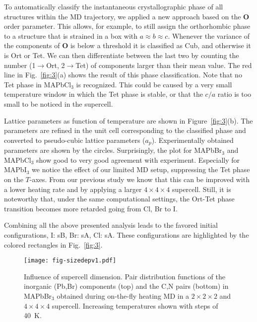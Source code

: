 \documentclass[journal=jpccck,manuscript=article,layout=twocolumn]{achemso}
\begin{document}
To automatically classify the instantaneous crystallographic phase of all structures within the MD trajectory, we applied a new approach based on the $\mathbf{O}$ order parameter. This allows, for example, to still assign the orthorhombic phase to a structure that is strained in a box with $a\approx{}b\approx{}c$. Whenever the variance of the components of $\mathbf{O}$ is below a threshold it is classified as Cub, and otherwise it is Ort or Tet. We can then differentiate between the last two by counting the number (1$\rightarrow{}$Ort, 2$\rightarrow{}$Tet) of components larger than their mean value. The red line in Fig.~\ref{fig:3}(a) shows the result of this phase classification. Note that no Tet phase in MAPbCl$_3$ is recognized. This could be caused by a very small temperature window in which the Tet phase is stable, or that the $c/a$ ratio is too small to be noticed in the supercell.

Lattice parameters as function of temperature are shown in Figure~\ref{fig:3}(b). The parameters are refined in the unit cell corresponding to the classified phase and converted to pseudo-cubic lattice parameters ($a_p$). Experimentally obtained parameters are shown by the circles. Surprisingly, the plot for MAPbBr$_3$ and MAPbCl$_3$ show good to very good agreement with experiment. Especially for MAPbI$_3$ we notice the effect of our limited MD setup, suppressing the Tet phase on the $T$-axes. From our previous study we know that this can be improved with a lower heating rate and by applying a larger $4\times4\times4$ supercell. Still, it is noteworthy that, under the same computational settings, the Ort-Tet phase transition becomes more retarded going from Cl, Br to I.

Combining all the above presented analysis leads to the favored initial configurations, I: sB, Br: sA, Cl: sA. These configurations are highlighted by the colored rectangles in Fig.~\ref{fig:3}.



\begin{figure}[!b]
    \begin{center}
    \texttt{[image: fig-sizedepv1.pdf]}
    \end{center}
   \caption{Influence of supercell dimension. Pair distribution functions of the inorganic (Pb,Br) components (top) and the C,N pairs (bottom) in MAPbBr$_3$ obtained during on-the-fly heating MD in a $2\times2\times2$ and $4\times4\times4$ supercell. Increasing temperatures shown with steps of 40~K.}
\label{fig:sizedep}
\end{figure}
\end{document}
